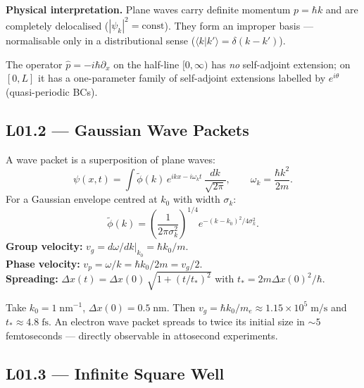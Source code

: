 \textbf{Physical interpretation.}
Plane waves carry definite momentum $p = \hbar k$ and are completely delocalised
($|\psi_k|^2 = \mathrm{const}$). They form an improper basis — normalisable only
in a distributional sense ($\langle k|k'\rangle = \delta(k-k')$).

 \quad
The operator $\hat{p} = -i\hbar\partial_x$ on the half-line $[0,\infty)$ has
\emph{no} self-adjoint extension; on $[0,L]$ it has a one-parameter family
of self-adjoint extensions labelled by $e^{i\theta}$ (quasi-periodic BCs).

\subsection*{L01.2 — Gaussian Wave Packets}
\label{sec:L01.2}

\begin{tcolorbox}[lecturebox, title={L01.2 Main result}]
A wave packet is a superposition of plane waves:
\begin{equation}
  \psi(x,t) = \int \tilde{\phi}(k)\,e^{ikx - i\omega_k t}\,\frac{dk}{\sqrt{2\pi}},
  \qquad \omega_k = \frac{\hbar k^2}{2m}.
  \label{eq:L01.3}
\end{equation}
For a Gaussian envelope centred at $k_0$ with width $\sigma_k$:
\begin{equation}
  \tilde{\phi}(k) = \left(\frac{1}{2\pi\sigma_k^2}\right)^{1/4}
    e^{-(k-k_0)^2/4\sigma_k^2}.
  \label{eq:L01.4}
\end{equation}
\textbf{Group velocity:} $v_g = d\omega/dk\big|_{k_0} = \hbar k_0/m$.\\
\textbf{Phase velocity:} $v_p = \omega/k = \hbar k_0/2m = v_g/2$.\\
\textbf{Spreading:} $\Delta x(t) = \Delta x(0)\,\sqrt{1 + (t/t_*)^2}$ with
$t_* = 2m\Delta x(0)^2/\hbar$.
\end{tcolorbox}

\begin{example}
Take $k_0 = 1\;\mathrm{nm}^{-1}$, $\Delta x(0) = 0.5\;\mathrm{nm}$.
Then $v_g = \hbar k_0/m_e \approx 1.15\times10^5\;\mathrm{m/s}$ and
$t_* \approx 4.8\;\mathrm{fs}$. An electron wave packet spreads to twice its
initial size in $\sim5$ femtoseconds — directly observable in attosecond experiments.
\end{example}

\subsection*{L01.3 — Infinite Square Well}
\label{sec:L01.3}


